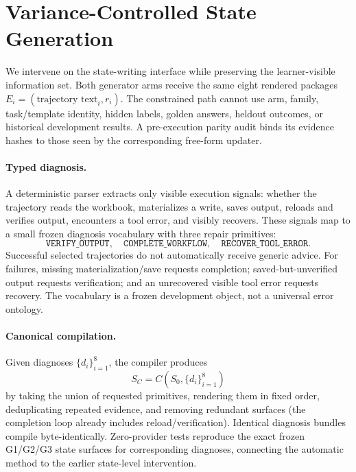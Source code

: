 \section{Variance-Controlled State Generation}
\label{sec:method}

We intervene on the state-writing interface while preserving the learner-visible information set. Both generator arms receive the same eight rendered packages $E_i=(\text{trajectory text}_i,r_i)$. The constrained path cannot use arm, family, task/template identity, hidden labels, golden answers, heldout outcomes, or historical development results. A pre-execution parity audit binds its evidence hashes to those seen by the corresponding free-form updater.

\paragraph{Typed diagnosis.}
A deterministic parser extracts only visible execution signals: whether the trajectory reads the workbook, materializes a write, saves output, reloads and verifies output, encounters a tool error, and visibly recovers. These signals map to a small frozen diagnosis vocabulary with three repair primitives:
\begin{equation}
\texttt{VERIFY\_OUTPUT},\quad \texttt{COMPLETE\_WORKFLOW},\quad \texttt{RECOVER\_TOOL\_ERROR}.
\end{equation}
Successful selected trajectories do not automatically receive generic advice. For failures, missing materialization/save requests completion; saved-but-unverified output requests verification; and an unrecovered visible tool error requests recovery. The vocabulary is a frozen development object, not a universal error ontology.

\paragraph{Canonical compilation.}
Given diagnoses $\{d_i\}_{i=1}^{8}$, the compiler produces
\begin{equation}
S_C=C(S_0,\{d_i\}_{i=1}^{8})
\end{equation}
by taking the union of requested primitives, rendering them in fixed order, deduplicating repeated evidence, and removing redundant surfaces (the completion loop already includes reload/verification). Identical diagnosis bundles compile byte-identically. Zero-provider tests reproduce the exact frozen G1/G2/G3 state surfaces for corresponding diagnoses, connecting the automatic method to the earlier state-level intervention.

